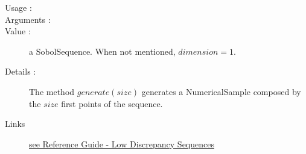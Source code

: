 \begin{description}

\item[Usage :] \rule{0pt}{1em}

\item[Arguments :]  \rule{0pt}{1em}

\item[Value :] a SobolSequence. When not mentioned, $dimension=1$.

\item[Details :]  The method $generate(size)$ generates a NumericalSample composed by the $size$ first points of the sequence.


\item[Links] \rule{0pt}{1em}
  \href{OpenTURNS_ReferenceGuide.pdf}{see Reference Guide - Low Discrepancy Sequences}
\end{description}

